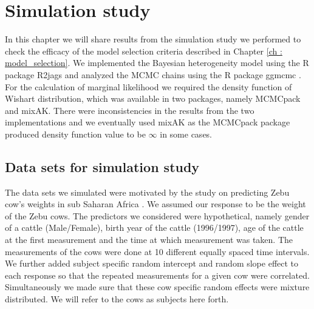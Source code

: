 
\chapter{Simulation study}
\label{ch : simulation_study}

In this chapter we will share results from the simulation study we performed to check the efficacy of the model selection criteria described in Chapter \ref{ch : model_selection}. We implemented the Bayesian heterogeneity model using the R package R2jags \citep{su_r2jags:_2015} and analyzed the MCMC chains using the R package ggmcmc \citep{marin_ggmcmc:_2016}. For the calculation of marginal likelihood we required the density function of Wishart distribution, which was available in two packages, namely MCMCpack and mixAK. There were inconsistencies in the results from the two implementations and we eventually used mixAK \citep{komarek_mixak:_2015} as the MCMCpack package produced density function value to be $\infty$ in some cases.

\section{Data sets for simulation study}
The data sets we simulated were motivated by the study on predicting Zebu cow's weights in sub Saharan Africa \citep{lesosky_live_2012}. We assumed our response to be the weight of the Zebu cows. The predictors we considered were hypothetical, namely gender of a cattle (Male/Female), birth year of the cattle (1996/1997), age of the cattle at the first measurement and the time at which measurement was taken. The measurements of the cows were done at 10 different equally spaced time intervals. We further added subject specific random intercept and random slope effect to each response so that the repeated measurements for a given cow were correlated. Simultaneously we made sure that these cow specific random effects were mixture distributed. We will refer to the cows as subjects here forth.

